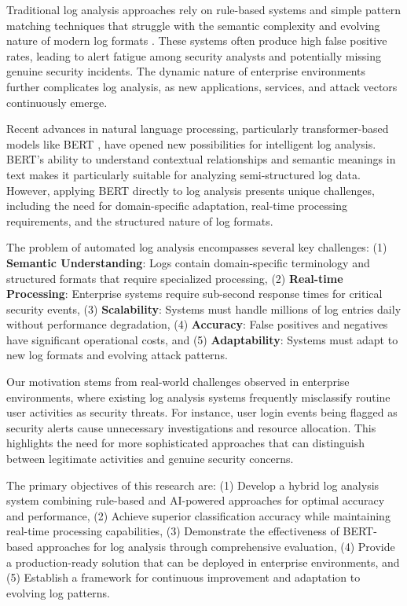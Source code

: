 \documentclass[conference]{IEEEtran}
\begin{document}
Traditional log analysis approaches rely on rule-based systems and simple pattern matching techniques that struggle with the semantic complexity and evolving nature of modern log formats \cite{he2017drain}. These systems often produce high false positive rates, leading to alert fatigue among security analysts and potentially missing genuine security incidents. The dynamic nature of enterprise environments further complicates log analysis, as new applications, services, and attack vectors continuously emerge.

Recent advances in natural language processing, particularly transformer-based models like BERT \cite{devlin2018bert}, have opened new possibilities for intelligent log analysis. BERT's ability to understand contextual relationships and semantic meanings in text makes it particularly suitable for analyzing semi-structured log data. However, applying BERT directly to log analysis presents unique challenges, including the need for domain-specific adaptation, real-time processing requirements, and the structured nature of log formats.

The problem of automated log analysis encompasses several key challenges: (1) \textbf{Semantic Understanding}: Logs contain domain-specific terminology and structured formats that require specialized processing, (2) \textbf{Real-time Processing}: Enterprise systems require sub-second response times for critical security events, (3) \textbf{Scalability}: Systems must handle millions of log entries daily without performance degradation, (4) \textbf{Accuracy}: False positives and negatives have significant operational costs, and (5) \textbf{Adaptability}: Systems must adapt to new log formats and evolving attack patterns.

Our motivation stems from real-world challenges observed in enterprise environments, where existing log analysis systems frequently misclassify routine user activities as security threats. For instance, user login events being flagged as security alerts cause unnecessary investigations and resource allocation. This highlights the need for more sophisticated approaches that can distinguish between legitimate activities and genuine security concerns.

The primary objectives of this research are: (1) Develop a hybrid log analysis system combining rule-based and AI-powered approaches for optimal accuracy and performance, (2) Achieve superior classification accuracy while maintaining real-time processing capabilities, (3) Demonstrate the effectiveness of BERT-based approaches for log analysis through comprehensive evaluation, (4) Provide a production-ready solution that can be deployed in enterprise environments, and (5) Establish a framework for continuous improvement and adaptation to evolving log patterns.
\end{document}
